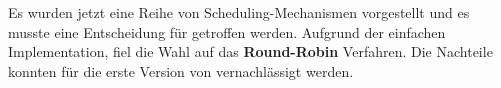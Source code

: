 Es wurden jetzt eine Reihe von Scheduling-Mechanismen vorgestellt und es musste eine Entscheidung f\"ur \mops getroffen werden. Aufgrund der einfachen Implementation, fiel die Wahl auf das \textbf{Round-Robin} Verfahren. Die Nachteile konnten f\"ur die erste Version von \mops vernachl\"assigt werden.
